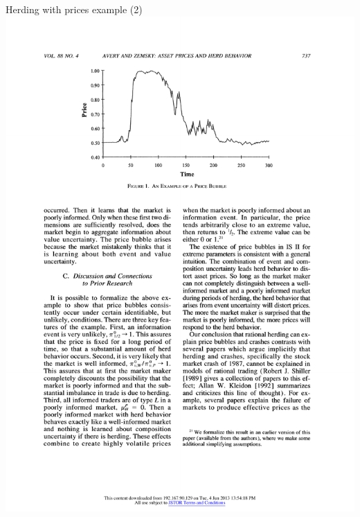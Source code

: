\documentclass[english,10pt
,aspectratio=169
]{beamer}
\begin{document}
\begin{frame}{Herding with prices example (2)}
	\includegraphics[width=0.10\paperwidth]{pics/PriceBubble1} \hfill

\end{frame}
\end{document}
